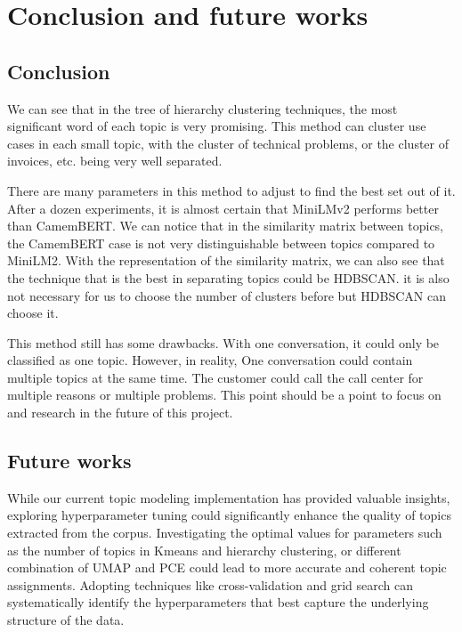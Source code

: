 \chapter{Conclusion and future works}

\startcontents[chapters]
\printmyminitoc{

}

\section{Conclusion}

We can see that in the tree of hierarchy clustering techniques, the most significant word of each topic is very promising. This method can cluster use cases in each small topic, with the cluster of technical problems, or the cluster of invoices, etc. being very well separated. 

There are many parameters in this method to adjust to find the best set out of it. After a dozen experiments, it is almost certain that MiniLMv2 performs better than CamemBERT. We can notice that in the similarity matrix between topics, the CamemBERT case is not very distinguishable between topics compared to MiniLM2. With the representation of the similarity matrix, we can also see that the technique that is the best in separating topics could be HDBSCAN. it is also not necessary for us to choose the number of clusters before but HDBSCAN can choose it.

This method still has some drawbacks. With one conversation, it could only be classified as one topic. However, in reality, One conversation could contain multiple topics at the same time. The customer could call the call center for multiple reasons or multiple problems. This point should be a point to focus on and research in the future of this project.

\section{Future works}

While our current topic modeling implementation has provided valuable insights, exploring hyperparameter tuning could significantly enhance the quality of topics extracted from the corpus. Investigating the optimal values for parameters such as the number of topics in Kmeans and hierarchy clustering, or different combination of UMAP and PCE could lead to more accurate and coherent topic assignments. Adopting techniques like cross-validation and grid search can systematically identify the hyperparameters that best capture the underlying structure of the data.

